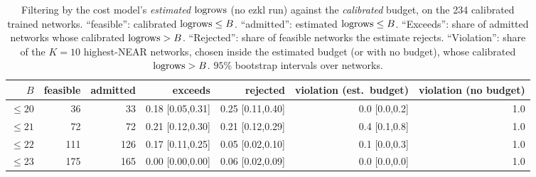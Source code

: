\begin{table}[h]
\centering
\caption{Filtering by the cost model's \emph{estimated} $\mathrm{logrows}$ (no ezkl run) against the \emph{calibrated} budget, on the 234 calibrated trained networks.
  ``feasible'': calibrated $\mathrm{logrows}\le B$.  ``admitted'': estimated $\mathrm{logrows}\le B$.  ``Exceeds'': share of admitted networks whose calibrated $\mathrm{logrows}>B$.
  ``Rejected'': share of feasible networks the estimate rejects.  ``Violation'': share of the $K{=}10$ highest-NEAR networks, chosen inside the estimated budget
  (or with no budget), whose calibrated $\mathrm{logrows}>B$.  $95\%$ bootstrap intervals over networks.}
\label{tab:estbudget}
\small
\begin{tabular}{rrrrrrr}
\toprule
$B$ & \textbf{feasible} & \textbf{admitted} & \textbf{exceeds} & \textbf{rejected} & \textbf{violation (est.\ budget)} & \textbf{violation (no budget)} \\
\midrule
$\le20$ & 36 & 33 & 0.18 {\scriptsize[0.05,0.31]} & 0.25 {\scriptsize[0.11,0.40]} & 0.0 {\scriptsize[0.0,0.2]} & 1.0 \\
$\le21$ & 72 & 72 & 0.21 {\scriptsize[0.12,0.30]} & 0.21 {\scriptsize[0.12,0.29]} & 0.4 {\scriptsize[0.1,0.8]} & 1.0 \\
$\le22$ & 111 & 126 & 0.17 {\scriptsize[0.11,0.25]} & 0.05 {\scriptsize[0.02,0.10]} & 0.1 {\scriptsize[0.0,0.3]} & 1.0 \\
$\le23$ & 175 & 165 & 0.00 {\scriptsize[0.00,0.00]} & 0.06 {\scriptsize[0.02,0.09]} & 0.0 {\scriptsize[0.0,0.0]} & 1.0 \\
\bottomrule
\end{tabular}
\end{table}
